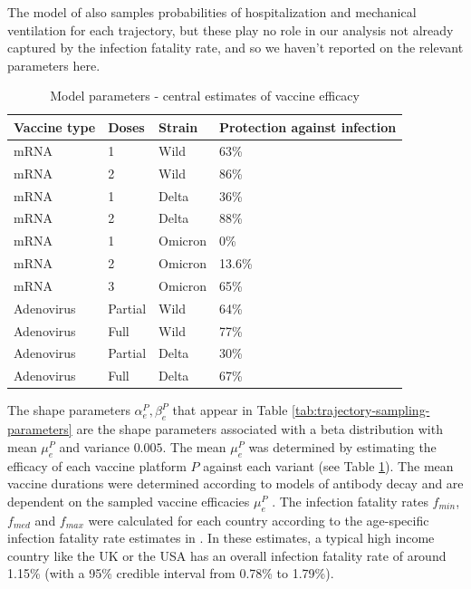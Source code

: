 \documentclass{article}
\begin{document}
The model of \citet{watsonoliverj.COVID19LMICReports2022} also samples probabilities of hospitalization and mechanical ventilation for each trajectory, but these play no role in our analysis not already captured by the infection fatality rate, and so we haven't reported on the relevant parameters here.

\begin{table}

\caption{\label{tab:vaccine-efficacy}Model parameters - central estimates of vaccine efficacy}
\centering
\begin{tabular}[t]{llll}
\toprule
Vaccine type & Doses & Strain & Protection against infection\\
\midrule
mRNA & 1 & Wild & 63\%\\
mRNA & 2 & Wild & 86\%\\
mRNA & 1 & Delta & 36\%\\
mRNA & 2 & Delta & 88\%\\
mRNA & 1 & Omicron & 0\%\\
mRNA & 2 & Omicron & 13.6\%\\
mRNA & 3 & Omicron & 65\%\\
Adenovirus & Partial & Wild & 64\%\\
Adenovirus & Full & Wild & 77\%\\
Adenovirus & Partial & Delta & 30\%\\
Adenovirus & Full & Delta & 67\%\\
\bottomrule
\end{tabular}
\end{table}

The shape parameters \(\alpha_e^P, \beta_e^P\) that appear in Table \ref{tab:trajectory-sampling-parameters} are the shape parameters associated with a beta distribution with mean \(\mu_e^P\) and variance \(0.005\). The mean \(\mu_e^P\) was determined by estimating the efficacy of each vaccine platform \(P\) against each variant (see Table \ref{tab:vaccine-efficacy}). The mean vaccine durations were determined according to models of antibody decay and are dependent on the sampled vaccine efficacies \(\mu_e^P\) \citep{watsonoliverj.COVID19LMICReports2022}. The infection fatality rates \(f_{min}\), \(f_{med}\) and \(f_{max}\) were calculated for each country according to the age-specific infection fatality rate estimates in \citep{brazeauReport34COVID192020}. In these estimates, a typical high income country like the UK or the USA has an overall infection fatality rate of around 1.15\% (with a 95\% credible interval from 0.78\% to 1.79\%).
\end{document}
